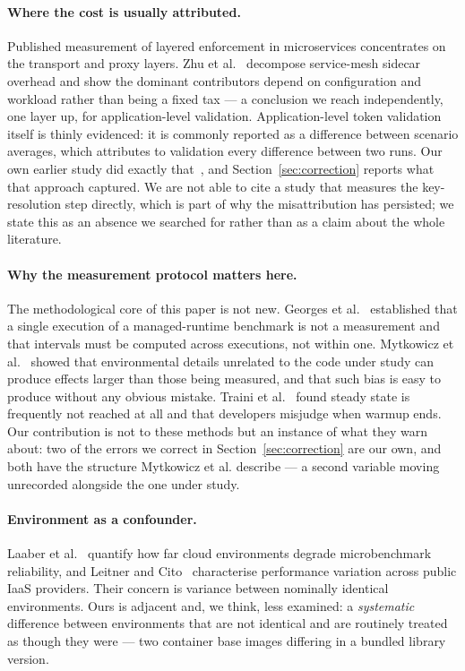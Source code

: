 \documentclass[pdflatex,sn-basic,twocolumn]{sn-jnl}
\begin{document}
\paragraph{Where the cost is usually attributed.} Published measurement of
layered enforcement in microservices concentrates on the transport and proxy
layers. Zhu et al.~\cite{zhu2023dissecting} decompose service-mesh sidecar
overhead and show the dominant contributors depend on configuration and workload
rather than being a fixed tax --- a conclusion we reach independently, one layer
up, for application-level validation. Application-level token validation itself
is thinly evidenced: it is commonly reported as a difference between scenario
averages, which attributes to validation every difference between two runs. Our
own earlier study did exactly that~\cite{sikdar2026quantifying}, and
Section~\ref{sec:correction} reports what that approach captured. We are not able
to cite a study that measures the key-resolution step directly, which is part of
why the misattribution has persisted; we state this as an absence we searched
for rather than as a claim about the whole literature.

\paragraph{Why the measurement protocol matters here.} The methodological core
of this paper is not new. Georges et al.~\cite{georges2007statistically}
established that a single execution of a managed-runtime benchmark is not a
measurement and that intervals must be computed across executions, not within
one. Mytkowicz et al.~\cite{mytkowicz2009wrong} showed that environmental
details unrelated to the code under study can produce effects larger than those
being measured, and that such bias is easy to produce without any obvious
mistake. Traini et al.~\cite{traini2022steady} found steady state is frequently
not reached at all and that developers misjudge when warmup ends. Our
contribution is not to these methods but an instance of what they warn about: two
of the errors we correct in Section~\ref{sec:correction} are our own, and both
have the structure Mytkowicz et al. describe --- a second variable moving
unrecorded alongside the one under study.

\paragraph{Environment as a confounder.} Laaber et al.~\cite{laaber2019cloud}
quantify how far cloud environments degrade microbenchmark reliability, and
Leitner and Cito~\cite{leitner2016patterns} characterise performance variation
across public IaaS providers. Their concern is variance between nominally
identical environments. Ours is adjacent and, we think, less examined: a
\emph{systematic} difference between environments that are not identical and are
routinely treated as though they were --- two container base images differing in
a bundled library version.
\end{document}
